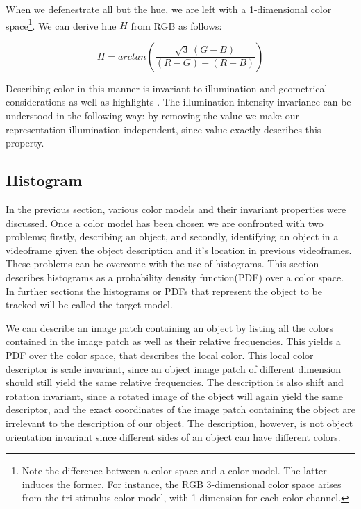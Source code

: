 \documentclass[a4paper,11pt]{article}
\begin{document}
When we defenestrate all but the hue, we are left with a 1-dimensional color space\footnote{Note the difference between a color space and a color model. The latter induces the former. For instance, the RGB 3-dimensional color space arises from the tri-stimulus color model, with 1 dimension for each color channel.}.  We can derive hue $H$ from RGB as follows:



\begin{equation}
\label{eq:hue}
H = arctan\left(\frac{\sqrt{3}\,(G-B)}{(R-G)+(R-B)}\right)
\end{equation} 



Describing color in this manner is invariant to illumination and geometrical considerations as well as highlights \cite{gevers_invariant}. The illumination intensity invariance can be understood in the following way: by removing the value we make our representation illumination independent, since value exactly describes this property.

		 

\subsection{Histogram}

In the previous section, various color models and their invariant properties were discussed. Once a color model has been chosen we are confronted with two problems; firstly, describing an object, and secondly, identifying an object in a videoframe given the object description and it's location in previous videoframes. These problems can be overcome with the use of histograms. This section describes histograms as a probability density function(PDF) over a color space. In further sections the histograms or PDFs that represent the object to be tracked will be called the target model.



We can describe an image patch containing an object by listing all the colors contained in the image patch as well as their relative frequencies. This yields a PDF over the color space, that describes the local color. This local color descriptor is scale invariant, since an object image patch of different dimension should still yield the same relative frequencies. The description is also shift and rotation invariant, since a rotated image of the object will again yield the same descriptor, and the exact coordinates of the image patch containing the object are irrelevant to the description of our object. The description, however, is not object orientation invariant since different sides of an object can have different colors. 
\end{document}

